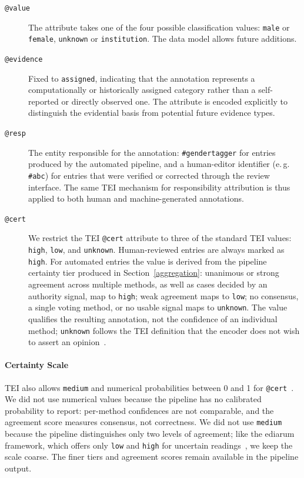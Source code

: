 \documentclass{eceasst}
\newcommand{\eg}{e.\,g.}
\begin{document}
\begin{description}
    \item[\texttt{@value}] The attribute takes one of the four possible classification values: \texttt{male} or \texttt{female}, \texttt{unknown} or \texttt{institution}. The data model allows future additions.

  \item[\texttt{@evidence}] Fixed to \texttt{assigned}, indicating that the annotation represents a computationally or historically assigned category rather than a self-reported or directly observed one. The attribute is encoded explicitly to distinguish the evidential basis from potential future evidence types.

  \item[\texttt{@resp}] The entity responsible for the annotation: \texttt{\#gendertagger} for entries produced by the automated pipeline, and a human-editor identifier (\eg{} \texttt{\#abc}) for entries that were verified or corrected through the review interface. The same TEI mechanism for responsibility attribution is thus applied to both human and machine-generated annotations.

  \item[\texttt{@cert}] We restrict the TEI \texttt{@cert} attribute to three of the standard TEI values: \texttt{high}, \texttt{low}, and \texttt{unknown}. Human-reviewed entries are always marked as \texttt{high}. For automated entries the value is derived from the pipeline certainty tier produced in Section~\ref{aggregation}: unanimous or strong agreement across multiple methods, as well as cases decided by an authority signal, map to \texttt{high}; weak agreement maps to \texttt{low}; no consensus, a single voting method, or no usable signal maps to \texttt{unknown}. The value qualifies the resulting annotation, not the confidence of an individual method; \texttt{unknown} follows the TEI definition that the encoder does not wish to assert an opinion~\cite[datatype \texttt{teidata.certainty}]{tei_consortium_tei_2026}.
\end{description}

\paragraph{Certainty Scale} TEI also allows \texttt{medium} and numerical probabilities between 0 and 1 for \texttt{@cert}~\cite[datatype \texttt{teidata.probCert}]{tei_consortium_tei_2026}. We did not use numerical values because the pipeline has no calibrated probability to report: per-method confidences are not comparable, and the agreement score measures consensus, not correctness. We did not use \texttt{medium} because the pipeline distinguishes only two levels of agreement; like the ediarum framework, which offers only \texttt{low} and \texttt{high} for uncertain readings~\cite{telota_ediarum_2024}, we keep the scale coarse. The finer tiers and agreement scores remain available in the pipeline output.
\end{document}
